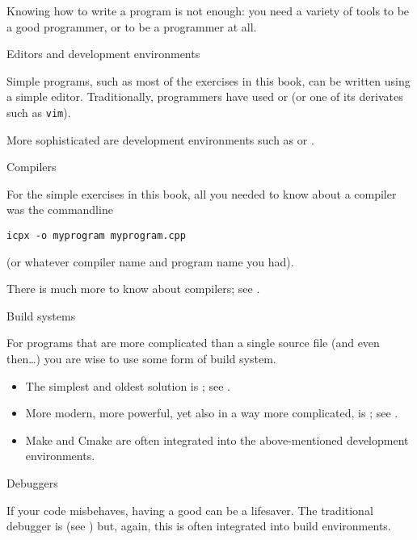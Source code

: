 
\lstset{language=Bash}

Knowing how to write a program is not enough: you need a variety of tools
to be a good programmer, or to be a programmer at all.

 {Editors and development environments}

Simple programs, such as most of the exercises in this book,
can be written using a simple editor.
Traditionally, programmers have used 
or  (or one of its derivates such as \texttt{vim}).

More sophisticated are development environments such as
or .

 {Compilers}

For the simple exercises in this book,
all you needed to know about a compiler
was the commandline
\begin{lstlisting}
icpx -o myprogram myprogram.cpp
\end{lstlisting}
(or whatever compiler name and program name you had).

There is much more to know about compilers;
see .

 {Build systems}

For programs that are more complicated than a single source file
(and even then\dots)
you are wise to use some form of build system.
\begin{itemize}
\item The simplest and oldest solution is ;
  see .
\item More modern, more powerful, yet also in a way more complicated,
  is ; see .
\item Make and Cmake are often integrated into the above-mentioned
  development environments.
\end{itemize}

 {Debuggers}

If your code misbehaves, having a good 
can be a lifesaver.
The traditional debugger is 
(see )
but, again, this is often integrated into build environments.

